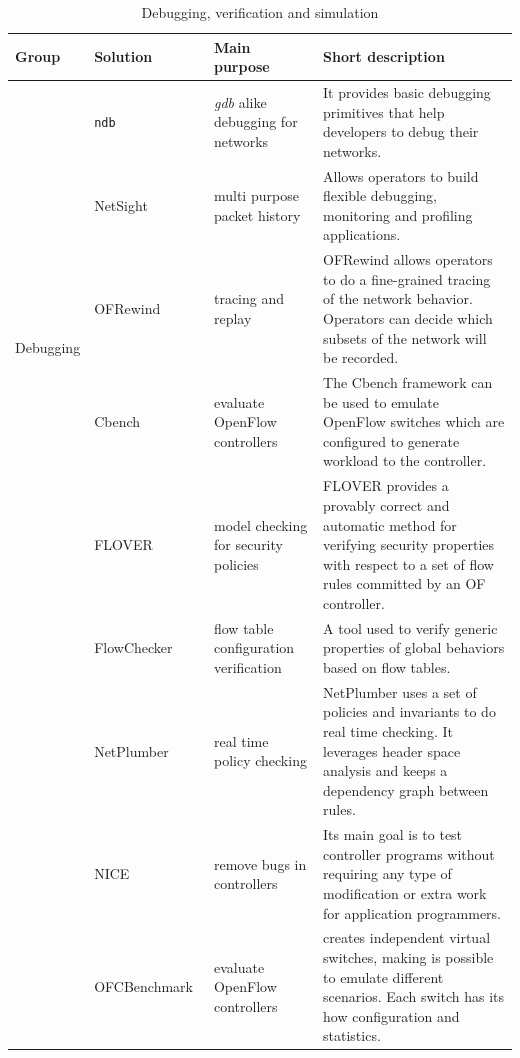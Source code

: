 {\renewcommand{\arraystretch}{1.4}
\begin{table}[!htp]
\caption{Debugging, verification and simulation}
\label{tab:debuggingverification}
\begin{center}
\footnotesize
\begin{tabularx}{\linewidth}{p{1.2cm}p{2.5cm}p{3.5cm}X}
\hline
\textbf{Group} & \textbf{Solution} & \textbf{Main purpose} & \textbf{Short description} \\
\hline
\multirow{5}{*}{Debugging} 
& \texttt{ndb}~\cite{handigol2012-1} & \textit{gdb} alike debugging for networks & It provides basic debugging primitives that help developers to debug their networks. \\
& NetSight~\cite{handigol2014} & multi purpose packet history & Allows operators to build flexible debugging, monitoring and profiling applications. \\ 
& OFRewind~\cite{wundsam2011} & tracing and replay & OFRewind allows operators to do a fine-grained tracing of the network behavior. Operators can decide which subsets of the network will be recorded. \\
\hline
\multirow{15}{*}{Verification} 
& Cbench~\cite{sherwood2011} & evaluate OpenFlow controllers & The Cbench framework can be used to emulate OpenFlow switches which are configured to generate workload to the controller.\\
& FLOVER~\cite{son2013} & model checking for security policies & FLOVER provides a provably correct and automatic method for verifying security properties with respect to a set of flow rules committed by an OF controller.\\
& FlowChecker~\cite{al-shaer2010} & flow table configuration verification & A tool used to verify generic properties of global behaviors based on flow tables.  \\
& NetPlumber~\cite{kazemian2013} & real time policy checking & NetPlumber uses a set of policies and invariants to do real time checking. It leverages header space analysis and keeps a dependency graph between rules.\\
& NICE~\cite{canini2012-1} & remove bugs in controllers & Its main goal is to test controller programs without requiring any type of modification or extra work for application programmers. \\
& OFCBenchmark~\cite{jarschel2012} & evaluate OpenFlow controllers & creates independent virtual switches, making is possible to emulate different scenarios. Each switch has its how configuration and statistics.\\

\end{tabularx}
\end{center}
\end{table}}
